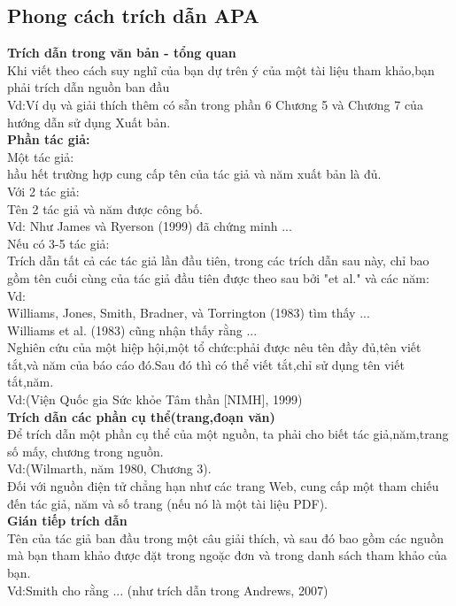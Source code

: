 \documentclass{hcmutarticle}
\begin{document}
\subsection{Phong cách trích dẫn APA }
{\bfseries Trích dẫn trong văn bản - tổng quan} \\
Khi viết theo cách suy nghĩ của bạn dự trên ý của một tài liệu tham khảo,bạn phải trích dẫn nguồn ban đầu\\
Vd:Ví dụ và giải thích thêm có sẵn trong phần 6 Chương 5 và Chương 7 của hướng dẫn sử dụng Xuất bản.\\
{\bfseries Phần tác giả:}\\
Một tác giả:\\hầu hết trường hợp cung cấp tên của tác giả và năm xuất bản là đủ.\\
Với 2 tác giả:\\Tên 2 tác giả và năm được công bố.\\
Vd: Như James và Ryerson (1999) đã chứng minh ... \\
Nếu có 3-5 tác giả:\\Trích dẫn tất cả các tác giả lần đầu tiên, trong các trích dẫn sau này, chỉ bao gồm tên cuối cùng của tác giả đầu tiên được theo sau bởi "et al." và các năm: \\
Vd:\\Williams, Jones, Smith, Bradner, và Torrington (1983) tìm thấy ... \\
Williams et al. (1983) cũng nhận thấy rằng ...\\
Nghiên cứu của một hiệp hội,một tổ chức:phải được nêu tên đầy đủ,tên viết tắt,và năm của báo cáo đó.Sau đó thì có thể viết tắt,chỉ sử dụng tên viết tắt,năm.\\Vd:(Viện Quốc gia Sức khỏe Tâm thần [NIMH], 1999) \\
{\bfseries Trích dẫn các phần cụ thể(trang,đoạn văn)}\\
Để trích dẫn một phần cụ thể của một nguồn, ta phải cho biết tác giả,năm,trang số mấy, chương trong nguồn.\\Vd:(Wilmarth, năm 1980, Chương 3).\\Đối với nguồn điện tử chẳng hạn như các trang Web, cung cấp một tham chiếu đến tác giả, năm và số trang (nếu nó là một tài liệu PDF).\\
{\bfseries Gián tiếp trích dẫn}\\
 Tên của tác giả ban đầu trong một câu giải thích, và sau đó bao gồm các nguồn mà bạn  tham khảo được đặt trong ngoặc đơn và trong danh sách tham khảo của bạn. \\Vd:Smith cho rằng ... (như trích dẫn trong Andrews, 2007)\\
\end{document}

